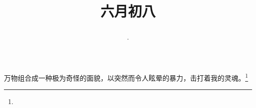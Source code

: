 \title{\date[d=13,m=7,y=2024][year:cn-y,年,month:cn,day:cn,日,·,weekday]·六月初八 }
万物组合成一种极为奇怪的面貌，以突然而令人眩晕的暴力，击打着我的灵魂。\footnote{ }

